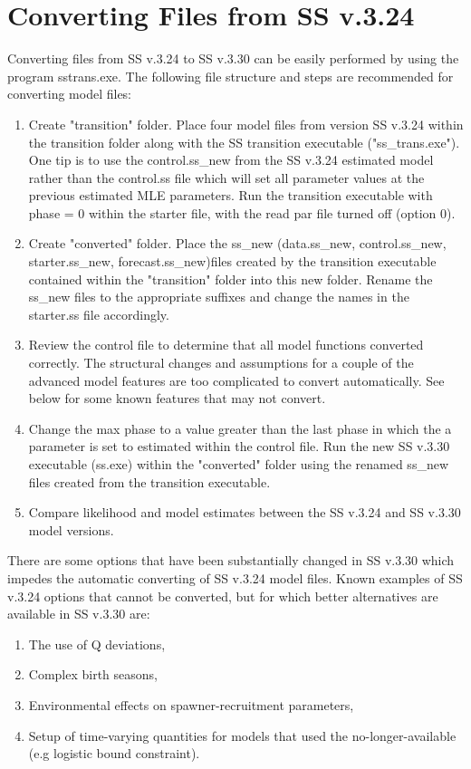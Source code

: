 \hypertarget{ConvIssues}{}
\section{Converting Files from SS v.3.24}
Converting files from SS v.3.24 to SS v.3.30 can be easily performed by using the program sstrans.exe. The following file structure and steps are recommended for converting model files:
\begin{enumerate}
	\item Create "transition" folder.  Place four model files from version SS v.3.24 within the transition folder along with the SS transition executable ("ss\_trans.exe").  One tip is to use the control.ss\_new from the SS v.3.24 estimated model rather than the control.ss file which will set all parameter values at the previous estimated MLE parameters.  Run the transition executable with phase = 0 within the starter file, with the read par file turned off (option 0).
	\item Create "converted" folder.  Place the ss\_new (data.ss\_new, control.ss\_new, starter.ss\_new, forecast.ss\_new)files created by the transition executable contained within the "transition" folder into this new folder.  Rename the ss\_new files to the appropriate suffixes and change the names in the starter.ss file accordingly.
	\item Review the control file to determine that all model functions converted correctly.  The structural changes and assumptions for a couple of the advanced model features are too complicated to convert automatically.  See below for some known features that may not convert.
	\item Change the max phase to a value greater than the last phase in which the a parameter is set to estimated within the control file.  Run the new SS v.3.30 executable (ss.exe) within the "converted" folder using the renamed ss\_new files created from the transition executable.
	\item Compare likelihood and model estimates between the SS v.3.24 and SS v.3.30 model versions.
\end{enumerate}

\noindent There are some options that have been substantially changed in SS v.3.30 which impedes the automatic converting of SS v.3.24 model files. Known examples of SS v.3.24 options that cannot be converted, but for which better alternatives are available in SS v.3.30 are:
\begin{enumerate}
	\item The use of Q deviations,
	\item Complex birth seasons,
	\item Environmental effects on spawner-recruitment parameters,
	\item Setup of time-varying quantities for models that used the no-longer-available (e.g logistic bound constraint).
\end{enumerate}

